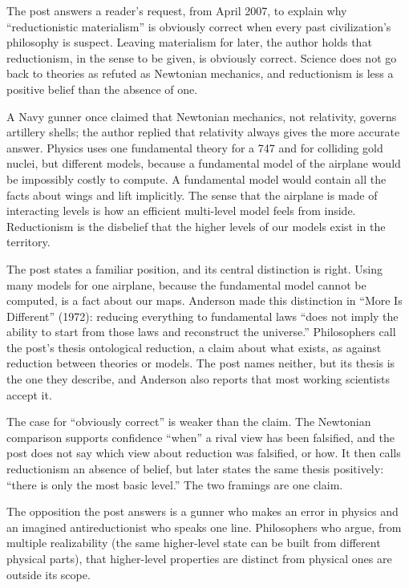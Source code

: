 \begin{afterword}
\summaryhead

The post answers a reader's request, from April 2007, to explain why ``reductionistic materialism'' is obviously correct when every past civilization's philosophy is suspect. Leaving materialism for later, the author holds that reductionism, in the sense to be given, is obviously correct. Science does not go back to theories as refuted as Newtonian mechanics, and reductionism is less a positive belief than the absence of one.

A Navy gunner once claimed that Newtonian mechanics, not relativity, governs artillery shells; the author replied that relativity always gives the more accurate answer. Physics uses one fundamental theory for a 747 and for colliding gold nuclei, but different models, because a fundamental model of the airplane would be impossibly costly to compute. A fundamental model would contain all the facts about wings and lift implicitly. The sense that the airplane is made of interacting levels is how an efficient multi-level model feels from inside. Reductionism is the disbelief that the higher levels of our models exist in the territory.

\responsehead

The post states a familiar position, and its central distinction is right. Using many models for one airplane, because the fundamental model cannot be computed, is a fact about our maps. Anderson made this distinction in ``More Is Different'' (1972): reducing everything to fundamental laws ``does not imply the ability to start from those laws and reconstruct the universe.'' Philosophers call the post's thesis ontological reduction, a claim about what exists, as against reduction between theories or models. The post names neither, but its thesis is the one they describe, and Anderson also reports that most working scientists accept it.

The case for ``obviously correct'' is weaker than the claim. The Newtonian comparison supports confidence ``when'' a rival view has been falsified, and the post does not say which view about reduction was falsified, or how. It then calls reductionism an absence of belief, but later states the same thesis positively: ``there is only the most basic level.'' The two framings are one claim.

The opposition the post answers is a gunner who makes an error in physics and an imagined antireductionist who speaks one line. Philosophers who argue, from multiple realizability (the same higher-level state can be built from different physical parts), that higher-level properties are distinct from physical ones are outside its scope.


\end{afterword}
